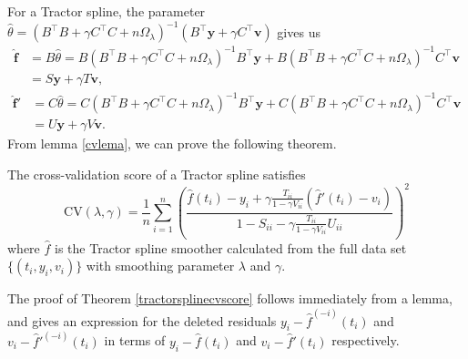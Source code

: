 For a Tractor spline, the parameter $\hat{\theta}=(B^\top B+\gamma C^\top C+n\Omega_\lambda)^{-1}(B^\top\mathbf{y}+\gamma C^\top\mathbf{v})$ gives us
\begin{equation}
\begin{split}
 \hat{\mathbf{f}}&=B\hat{\theta}=B(B^\top B+\gamma C^\top C+n\Omega_\lambda)^{-1}B^\top\mathbf{y}+B(B^\top B+\gamma C^\top C+n\Omega_\lambda)^{-1}C^\top\mathbf{v}\\&=S\mathbf{y}+\gamma T\mathbf{v},
 \end{split}
 \end{equation}
 \begin{equation}
 \begin{split}
\hat{\mathbf{f}}'&=C\hat{\theta}=C(B^\top B+\gamma C^\top C+n\Omega_\lambda)^{-1}B^\top\mathbf{y}+C(B^\top B+\gamma C^\top C+n\Omega_\lambda)^{-1}C^\top\mathbf{v}\\&=U\mathbf{y}+\gamma V\mathbf{v}.
 \end{split}
\end{equation}
From lemma \ref{cvlema}, we can prove the following theorem.
\begin{theorem}\label{tractorsplinecvscore}
The cross-validation score of a Tractor spline satisfies
\begin{equation}\label{tractorcv}
\mbox{CV}(\lambda,\gamma)=\frac{1}{n}\sum_{i=1}^{n} \left( \frac{\hat{f}(t_i)-y_i+\gamma \frac{T_{ii}}{1-\gamma V_{ii}}(\hat{f}'(t_i)-v_i)}{1-S_{ii}-\gamma\frac{T_{ii}}{1-\gamma V_{ii}}U_{ii}} \right)^2
\end{equation}
where $\hat{f}$ is the Tractor spline smoother calculated from the full data set $\{(t_i,y_i,v_i)\}$ with smoothing parameter $\lambda$ and $\gamma$.
\end{theorem}

The proof of Theorem \ref{tractorsplinecvscore} follows immediately from a lemma, and gives an expression for the deleted residuals $y_i-\hat{f}^{(-i)}(t_i)$ and $v_i-\hat{f}'^{(-i)}(t_i)$ in terms of $y_i-\hat{f}(t_i)$ and $v_i-\hat{f}'(t_i)$ respectively. 

